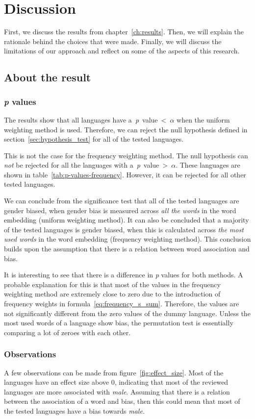 \section{Discussion}
First, we discuss the results from chapter~\ref{ch:results}. Then,
we will explain the rationale behind the choices that were made.
Finally, we will discuss the limitations of our approach and reflect on some
of the aspects of this research.

\subsection{About the result}
\subsubsection{\emph{p} values}
The results show that all languages have \mbox{a \emph{p} value < $\alpha$} when
the uniform weighting method is used. Therefore, we can reject the null hypothesis
defined in section~\ref{sec:hypothesis_test} for all of the tested languages.

This is not the case for the frequency weighting method. The null hypothesis can
\emph{not} be rejected for all the languages with \mbox{a \emph{p} value > $\alpha$}.
These languages are shown in table~\ref{tab:p-values-frequency}. However, it
can be rejected for all other tested languages.

We can conclude from the significance test that all of the tested languages are
gender biased, when gender bias is measured across \emph{all the words} in the
word embedding (uniform weighting method).
It can also be concluded that a majority of the tested languages is gender biased,
when this is calculated across \emph{the most used words} in the word
embedding (frequency weighting method). This conclusion builds
upon the assumption that there is a relation between word association and bias.

It is interesting to see that there is a difference in \emph{p} values for both methods.
A probable explanation for this is that most of the values in the frequency weighting
method are extremely close to zero due to the introduction of frequency
weights in formula~\eqref{eq:frequency_s_sum}. Therefore, the values are not
significantly different from
the zero values of the dummy language. Unless the most used words of a language
show bias, the permutation test is essentially comparing a lot of zeroes with each
other. 

\subsubsection{Observations}
A few observations can be made from figure~\ref{fig:effect_size}. Most
of the languages have an effect size above 0, indicating that most of the reviewed
languages are more associated with \emph{male}. Assuming that there is a relation between
the association of a word and bias, then this could mean that
most of the tested languages have a bias towards \emph{male}. 

